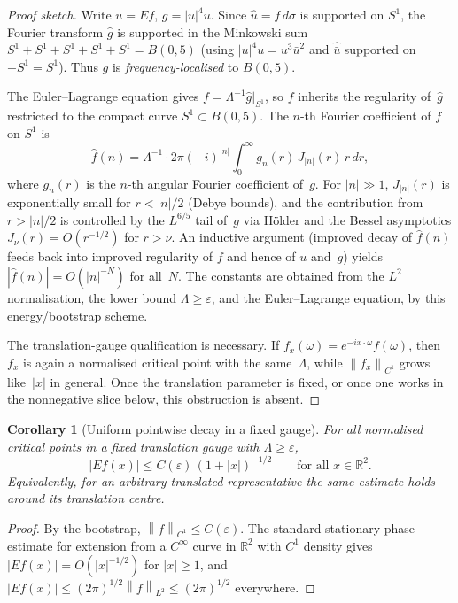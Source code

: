 \documentclass[12pt]{article}
\newtheorem{corollary}[theorem]{Corollary}
\theoremstyle{definition}
\theoremstyle{remark}
\newcommand{\R}{\mathbb{R}}
\newcommand{\wh}{\widehat}
\newcommand{\norm}[1]{\left\|#1\right\|}
\begin{document}
\begin{proof}[Proof sketch]
  Write $u=Ef$, $g=|u|^4u$.  Since $\wh u=f\,d\sigma$ is supported on
  $S^1$, the Fourier transform $\wh g$ is supported in the Minkowski sum
  $S^1+S^1+S^1+S^1+S^1=\overline{B(0,5)}$ (using $|u|^4u=u^3\bar u^2$
  and $\wh{\bar u}$ supported on $-S^1=S^1$).  Thus $g$ is
  \emph{frequency-localised} to $B(0,5)$.

  The Euler--Lagrange equation gives $f=\Lambda^{-1}\wh g\big|_{S^1}$,
  so $f$ inherits the regularity of~$\wh g$ restricted to the compact
  curve $S^1\subset B(0,5)$.  The $n$-th Fourier coefficient of $f$
  on $S^1$ is
  \begin{equation}\label{eq:fourier-bootstrap}
    \wh f(n)
    = \Lambda^{-1}\cdot 2\pi(-i)^{|n|}
      \int_0^\infty g_n(r)\,J_{|n|}(r)\,r\,dr,
  \end{equation}
  where $g_n(r)$ is the $n$-th angular Fourier coefficient of~$g$.
  For $|n|\gg 1$, $J_{|n|}(r)$ is exponentially small for $r<|n|/2$
  (Debye bounds), and the contribution from $r>|n|/2$ is controlled by
  the $L^{6/5}$ tail of~$g$ via H\"older and the Bessel asymptotics
  $J_\nu(r)=O(r^{-1/2})$ for $r>\nu$.  An inductive argument (improved
  decay of $\wh f(n)$ feeds back into improved regularity of $f$ and
  hence of $u$ and~$g$) yields $|\wh f(n)|=O(|n|^{-N})$ for all~$N$.
  The constants are obtained from the $L^2$ normalisation, the lower
  bound $\Lambda\geq\varepsilon$, and the Euler--Lagrange equation, by
  this energy/bootstrap scheme.

  The translation-gauge qualification is necessary.  If
  $f_x(\omega)=e^{-ix\cdot\omega}f(\omega)$, then $f_x$ is again a
  normalised critical point with the same~$\Lambda$, while
  $\norm{f_x}_{C^1}$ grows like~$|x|$ in general.  Once the translation
  parameter is fixed, or once one works in the nonnegative slice below,
  this obstruction is absent.
\end{proof}

\begin{corollary}[Uniform pointwise decay in a fixed gauge]
  \label{cor:uniform-decay}
  For all normalised critical points in a fixed translation gauge with
  $\Lambda\geq\varepsilon$,
  \[
    |Ef(x)|\leq C(\varepsilon)\,(1+|x|)^{-1/2}
    \qquad\text{for all }x\in\R^2.
  \]
  Equivalently, for an arbitrary translated representative the same
  estimate holds around its translation centre.
\end{corollary}
\begin{proof}
  By the bootstrap, $\norm{f}_{C^1}\leq C(\varepsilon)$.  The standard
  stationary-phase estimate for extension from a $C^\infty$ curve in
  $\R^2$ with $C^1$ density gives $|Ef(x)|=O(|x|^{-1/2})$
  for $|x|\geq 1$, and
  $|Ef(x)|\leq(2\pi)^{1/2}\norm{f}_{L^2}\leq(2\pi)^{1/2}$ everywhere.
\end{proof}
\end{document}
